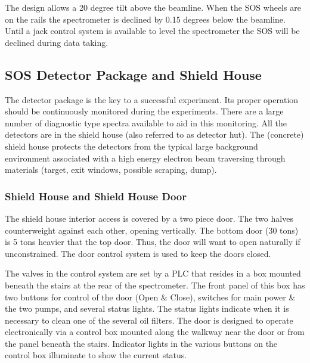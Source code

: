 The design allows a 20 degree tilt above the beamline. When the SOS
wheels are on the rails the spectrometer is declined by 0.15 degrees below
the beamline. Until a jack control system is available to level the
spectrometer the SOS will be declined during data taking.

\subsection{SOS Detector Package and Shield House }

The detector package is the key to a successful experiment. Its proper
operation should be continuously monitored during the experiments.
There are a large number of diagnostic type spectra available to aid in
this monitoring.
All the detectors are in the shield house (also referred to as detector hut).
The (concrete) shield house protects the detectors from the typical large
background environment associated with a high energy electron beam
traversing through materials (target, exit windows, possible scraping, dump).

\subsubsection{Shield House and Shield House Door}

The shield house interior access is covered by a two piece door. The two
halves counterweight against each other, opening vertically. The bottom
door (30 tons) is 5 tons heavier that the top door. Thus, the door will want
to open naturally if unconstrained. The door control system is used to keep
the doors closed.

The valves in the control system are set by a PLC that resides in a box
mounted beneath the stairs at the rear of the spectrometer. The front panel
of this box has two buttons for control of the door (Open \& Close),
switches for main power \& the two pumps, and several status lights. The
status lights indicate when it is necessary to clean one of the several oil
filters. The door is designed to operate electronically via a control box
mounted along the walkway near the door or from the panel beneath the
stairs. Indicator lights in the various buttons on the control box
illuminate to show the current status.

